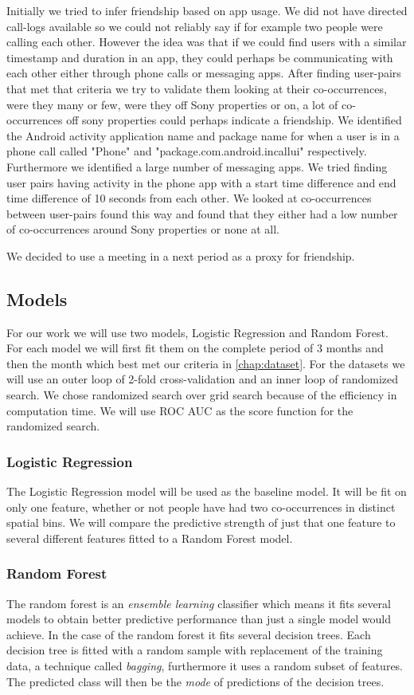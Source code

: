 Initially we tried to infer friendship based on app usage. We did not have directed call-logs available so we could not reliably say if for example two people were calling each other. However the idea was that if we could find users with a similar timestamp and duration in an app, they could perhaps be communicating with each other either through phone calls or messaging apps. After finding user-pairs that met that criteria we try to validate them looking at their co-occurrences, were they many or few, were they off Sony properties or on, a lot of co-occurrences off sony properties could perhaps indicate a friendship. We identified the Android activity application name and package name for when a user is in a phone call called "Phone" and "package.com.android.incallui" respectively. Furthermore we identified a large number of messaging apps. We tried finding user pairs having activity in the phone app with a start time difference and end time difference of 10 seconds from each other. We looked at co-occurrences between user-pairs found this way and found that they either had a low number of co-occurrences around Sony properties or none at all.

We decided to use a meeting in a next period as a proxy for friendship.

\subsection{Models}
For our work we will use two models, Logistic Regression and Random Forest. For each model we will first fit them on the complete period of 3 months and then the month which best met our criteria in \autoref{chap:dataset}. For the datasets we will use an outer loop of 2-fold cross-validation and an inner loop of randomized search. We chose randomized search over grid search because of the efficiency in computation time. We will use ROC AUC as the score function for the randomized search.


\subsubsection{Logistic Regression}
The Logistic Regression model will be used as the baseline model. It will be fit on only one feature, whether or not people have had two co-occurrences in distinct spatial bins. We will compare the predictive strength of just that one feature to several different features fitted to a Random Forest model.

\subsubsection{Random Forest}
The random forest is an \textit{ensemble learning} classifier which means it fits several models to obtain better predictive performance than just a single model would achieve. In the case of the random forest it fits several decision trees. Each decision tree is fitted with a random sample with replacement of the training data, a technique called \textit{bagging}, furthermore it uses a random subset of features. The predicted class will then be the \textit{mode} of predictions of the decision trees.

